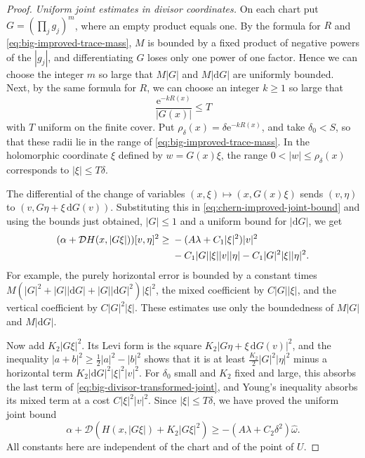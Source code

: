 \begin{proof}
\emph{Uniform joint estimates in divisor coordinates.} On each chart put $G=(\prod_jg_j)^m$, where an empty product equals one. By the formula for $R$ and \eqref{eq:big-improved-trace-mass}, $M$ is bounded by a fixed product of negative powers of the $|g_j|$, and differentiating $G$ loses only one power of one factor. Hence we can choose the integer $m$ so large that $M|G|$ and $M|\mathrm dG|$ are uniformly bounded. Next, by the same formula for $R$, we can choose an integer $k\geq1$ so large that
\[
 \frac{\mathrm e^{-kR(x)}}{|G(x)|}\leq T
\]
with $T$ uniform on the finite cover. Put $\rho_\delta(x)=\delta\mathrm e^{-kR(x)}$, and take $\delta_0<S$, so that these radii lie in the range of \eqref{eq:big-improved-trace-mass}. In the holomorphic coordinate $\xi$ defined by $w=G(x)\xi$, the range $0<|w|\leq\rho_\delta(x)$ corresponds to $|\xi|\leq T\delta$.

The differential of the change of variables $(x,\xi)\mapsto(x,G(x)\xi)$ sends $(v,\eta)$ to $(v,G\eta+\xi\,\mathrm dG(v))$. Substituting this in \eqref{eq:chern-improved-joint-bound} and using the bounds just obtained, $|G|\leq1$ and a uniform bound for $|\mathrm dG|$, we get
\begin{align}\label{eq:big-divisor-transformed-joint}
 (\alpha+\mathcal D H(x,|G\xi|))[v,\eta]^2
 \geq{}&-(A\lambda+C_1|\xi|^2)|v|^2\notag\\
        &-C_1|G||\xi||v||\eta|
                      -C_1|G|^2|\xi||\eta|^2.
\end{align}
For example, the purely horizontal error is bounded by a constant times $M(|G|^2+|G||\mathrm dG|+|G||\mathrm dG|^2)|\xi|^2$, the mixed coefficient by $C|G||\xi|$, and the vertical coefficient by $C|G|^2|\xi|$. These estimates use only the boundedness of $M|G|$ and $M|\mathrm dG|$.

Now add $K_2|G\xi|^2$. Its Levi form is the square $K_2|G\eta+\xi\,\mathrm dG(v)|^2$, and the inequality $|a+b|^2\geq\tfrac12|a|^2-|b|^2$ shows that it is at least $\frac{K_2}2|G|^2|\eta|^2$ minus a horizontal term $K_2|\mathrm dG|^2|\xi|^2|v|^2$. For $\delta_0$ small and $K_2$ fixed and large, this absorbs the last term of \eqref{eq:big-divisor-transformed-joint}, and Young's inequality absorbs its mixed term at a cost $C|\xi|^2|v|^2$. Since $|\xi|\leq T\delta$, we have proved the uniform joint bound
\begin{equation}\label{eq:big-second-corrected-joint}
 \alpha+\mathcal D(H(x,|G\xi|)+K_2|G\xi|^2)
                         \geq-(A\lambda+C_2\delta^2)\widehat\omega.
\end{equation}
All constants here are independent of the chart and of the point of $U$.


\end{proof}
